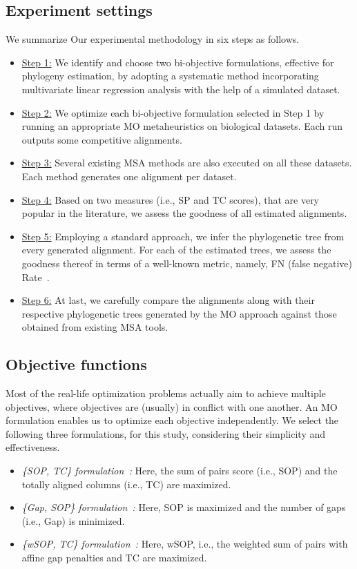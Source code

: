 \subsection{Experiment settings}
\label{sec:exp_settings}
We summarize Our experimental methodology in six steps as follows.\begin{itemize}
	\item \underline{Step 1:} We identify and choose two bi-objective formulations, effective for phylogeny estimation, by adopting a systematic method incorporating multivariate linear regression analysis with the help of a simulated dataset. \item \underline{Step 2:} We optimize each bi-objective formulation selected in Step 1 by
	 running an appropriate MO metaheuristics on biological datasets. Each run outputs some competitive alignments. 
	\item \underline{Step 3:} Several existing MSA methods are also executed on all these datasets. Each method generates one alignment per dataset.
\item \underline{Step 4:} Based on two measures (i.e., SP and TC scores), that are very popular in the literature, we assess the goodness of all estimated alignments. \item \underline{Step 5:} Employing a standard approach, we infer the phylogenetic tree from every generated alignment. For each of the estimated trees, we assess the goodness thereof in terms of a well-known metric, namely, FN (false negative) Rate~\citep{warnow2017computational}.
	\item \underline{Step 6:} At last, we carefully compare the alignments along with their respective phylogenetic trees generated by the MO approach against those obtained from existing MSA tools. \end{itemize}
\subsection{Objective functions}
\label{sec:formulation}
Most of the real-life optimization problems actually aim to achieve multiple objectives, where objectives are (usually) in conflict with one another. An MO formulation enables us to optimize each objective independently. We select the following three formulations, for this study, considering their simplicity and effectiveness. \begin{itemize}
	\item \textit{\{SOP, TC\} formulation~\citep{da2010alineaga}:} Here, the sum of pairs score (i.e., SOP) and the totally aligned columns (i.e., TC) are maximized. 

	\item \textit{\{Gap, SOP\} formulation~\citep{abbasi2015local}:} Here, SOP is maximized and the number of gaps (i.e., Gap) is minimized.
	
	\item \textit{\{wSOP, TC\} formulation~\citep{rubio2016hybrid}:} Here, wSOP, i.e., the weighted sum of pairs with affine gap penalties and TC are maximized.
\end{itemize}

